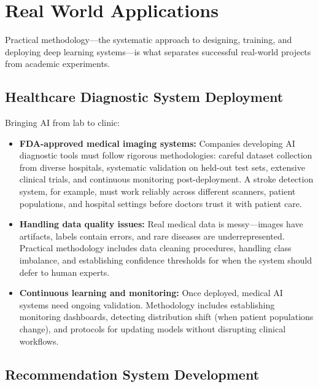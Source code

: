 
\section{Real World Applications}
\label{sec:methodology-real-world}

Practical methodology—the systematic approach to designing, training, and deploying deep learning systems—is what separates successful real-world projects from academic experiments.

\subsection{Healthcare Diagnostic System Deployment}

Bringing AI from lab to clinic:

\begin{itemize}
    \item \textbf{FDA-approved medical imaging systems:} Companies developing AI diagnostic tools must follow rigorous methodologies: careful dataset collection from diverse hospitals, systematic validation on held-out test sets, extensive clinical trials, and continuous monitoring post-deployment. A stroke detection system, for example, must work reliably across different scanners, patient populations, and hospital settings before doctors trust it with patient care.
    
    \item \textbf{Handling data quality issues:} Real medical data is messy—images have artifacts, labels contain errors, and rare diseases are underrepresented. Practical methodology includes data cleaning procedures, handling class imbalance, and establishing confidence thresholds for when the system should defer to human experts.
    
    \item \textbf{Continuous learning and monitoring:} Once deployed, medical AI systems need ongoing validation. Methodology includes establishing monitoring dashboards, detecting distribution shift (when patient populations change), and protocols for updating models without disrupting clinical workflows.
\end{itemize}

\subsection{Recommendation System Development}

